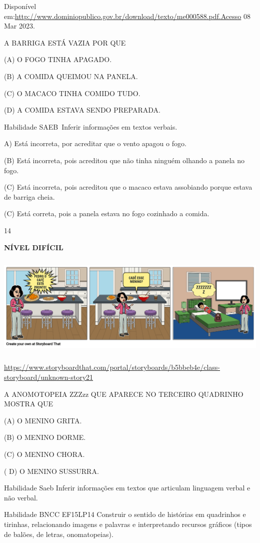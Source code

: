 {{Disponível
em:\url{http://www.dominiopublico.gov.br/download/texto/me000588.pdf.Acesso}
08 Mar 2023.

A BARRIGA ESTÁ VAZIA POR QUE

(A) O FOGO TINHA APAGADO.

(B) A COMIDA QUEIMOU NA PANELA.

(C) O MACACO TINHA COMIDO TUDO.

(D) A COMIDA ESTAVA SENDO PREPARADA.

Habilidade SAEB~Inferir informações em textos verbais.

A) Está incorreta, por acreditar que o vento apagou o fogo.

(B) Está incorreta, pois acreditou que não tinha ninguém olhando a
panela no fogo.

(C) Está incorreta, pois acreditou que o macaco estava assobiando porque
estava de barriga cheia.

(C) Está correta, pois a panela estava no fogo cozinhado a comida.

\num{14}

\textbf{NÍVEL DIFÍCIL}

\includegraphics[width=5.90556in,height=1.95556in]{media/image146.png}

\url{https://www.storyboardthat.com/portal/storyboards/b5bbeb4e/class-storyboard/unknown-story21}

A ANOMOTOPEIA ZZZzz QUE APARECE NO TERCEIRO QUADRINHO MOSTRA QUE

(A) O MENINO GRITA.

(B) O MENINO DORME.

(C) O MENINO CHORA.

( D) O MENINO SUSSURRA.

\protect\hypertarget{_Hlk129336975}{}{}Habilidade Saeb Inferir
informações em textos que articulam linguagem verbal e não verbal.

Habilidade BNCC EF15LP14 Construir o sentido de histórias em quadrinhos
e tirinhas, relacionando imagens e palavras e interpretando recursos
gráficos (tipos de balões, de letras, onomatopeias).

}}
